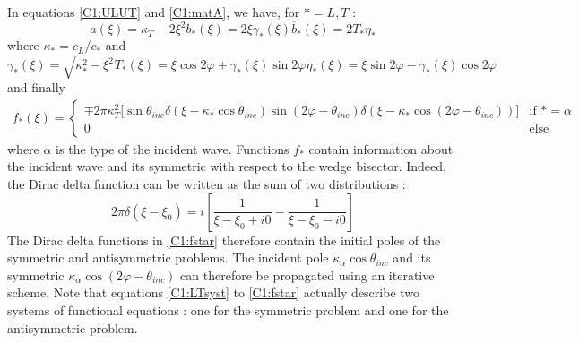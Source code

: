 In equations \eqref{C1:ULUT} and \eqref{C1:matA}, we have, for $*=L,T$ :
\begin{subequations}
\begin{equation}
a(\xi)=\kappa_T-2\xi^2
\end{equation}
\begin{equation}
b_*(\xi)=2\xi\gamma_*(\xi)
\end{equation}
\begin{equation}
\overline{b}_*(\xi)=2T_*\eta_*
\end{equation}
\end{subequations}
where $\kappa_*=c_L/c_*$ and
\begin{subequations}
\begin{equation}
\gamma_*(\xi)=\sqrt{\kappa_*^2-\xi^2}
\label{C1:gammastar}
\end{equation}
\begin{equation}
T_*(\xi)=\xi\cos 2\varphi+\gamma_*(\xi)\sin 2\varphi
\end{equation}
\begin{equation}
\eta_*(\xi)=\xi\sin 2\varphi-\gamma_*(\xi)\cos 2\varphi
\end{equation}
\end{subequations}
and finally
\begin{eqnarray}
f_*(\xi)=\left\{
\begin{array}{cc}
\mp2\pi\kappa_T^2\lbrack \sin\theta_{inc}\delta(\xi-\kappa_*\cos\theta_{inc})\sin(2\varphi-\theta_{inc})\delta(\xi-\kappa_*\cos(2\varphi-\theta_{inc}))\rbrack & \mbox{if } *=\alpha \\
0&\mbox{else}
\end{array}
\right.
\label{C1:fstar}
\end{eqnarray}
where $\alpha$ is the type of the incident wave. Functions $f_*$ contain information about the incident wave and its symmetric with respect to the wedge bisector. Indeed, the Dirac delta function can be written as the sum of two distributions \cite{GautesenFradkin} :
\begin{equation}
2\pi\delta(\xi-\xi_0)=i\left[ \dfrac{1}{\xi-\xi_0+i0}-\dfrac{1}{\xi-\xi_0-i0} \right]
\end{equation}
The Dirac delta functions in \eqref{C1:fstar} therefore contain the initial poles of the symmetric and antisymmetric problems. The incident pole $\kappa_{\alpha}\cos\theta_{inc}$ and its symmetric $\kappa_{\alpha}\cos(2\varphi-\theta_{inc})$ can therefore be propagated using an iterative scheme. Note that equations \eqref{C1:LTsyst} to \eqref{C1:fstar} actually describe two systems of functional equations : one for the symmetric problem and one for the antisymmetric problem.

